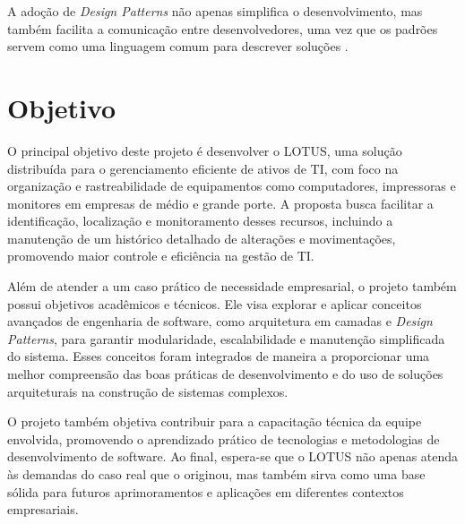 A adoção de \textit{Design Patterns} não apenas simplifica o desenvolvimento, mas também facilita a comunicação entre desenvolvedores, uma vez que os padrões servem como uma linguagem comum para descrever soluções \cite{gamma1994}.










\section{Objetivo}

O principal objetivo deste projeto é desenvolver o LOTUS, uma solução distribuída para o gerenciamento eficiente de ativos de TI, com foco na organização e rastreabilidade de equipamentos como computadores, impressoras e monitores em empresas de médio e grande porte. A proposta busca facilitar a identificação, localização e monitoramento desses recursos, incluindo a manutenção de um histórico detalhado de alterações e movimentações, promovendo maior controle e eficiência na gestão de TI.

Além de atender a um caso prático de necessidade empresarial, o projeto também possui objetivos acadêmicos e técnicos. Ele visa explorar e aplicar conceitos avançados de engenharia de software, como arquitetura em camadas e \textit{Design Patterns}, para garantir modularidade, escalabilidade e manutenção simplificada do sistema. Esses conceitos foram integrados de maneira a proporcionar uma melhor compreensão das boas práticas de desenvolvimento e do uso de soluções arquiteturais na construção de sistemas complexos.

O projeto também objetiva contribuir para a capacitação técnica da equipe envolvida, promovendo o aprendizado prático de tecnologias e metodologias de desenvolvimento de software. Ao final, espera-se que o LOTUS não apenas atenda às demandas do caso real que o originou, mas também sirva como uma base sólida para futuros aprimoramentos e aplicações em diferentes contextos empresariais.
